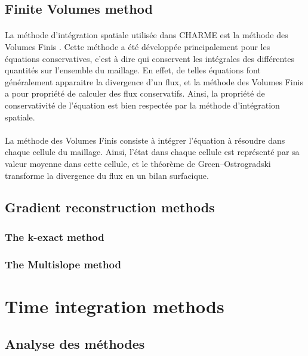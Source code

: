     \subsection{Finite Volumes method}

      \paragraph{}
      La méthode d'intégration spatiale utilisée dans CHARME est la méthode des Volumes Finis \cite{EymardGallouetHerbin2000}.
      Cette méthode a été développée principalement pour les équations conservatives, c'est à dire qui conservent les intégrales des différentes quantités sur l'ensemble du maillage.
      En effet, de telles équations font généralement apparaitre la divergence d'un flux, et la méthode des Volumes Finis a pour propriété de calculer des flux conservatifs.
      Ainsi, la propriété de conservativité de l'équation est bien respectée par la méthode d'intégration spatiale.

      \paragraph{}
      La méthode des Volumes Finis consiste à intégrer l'équation à résoudre dans chaque cellule du maillage.
      Ainsi, l'état dans chaque cellule est représenté par sa valeur moyenne dans cette cellule, et le théorème de Green--Ostrogradski transforme la divergence du flux en un bilan surfacique.







    \subsection{Gradient reconstruction methods}
      \subsubsection{The k-exact method}
      \subsubsection{The Multislope method}


  \section{Time integration methods}
    \subsection{Analyse des méthodes}
